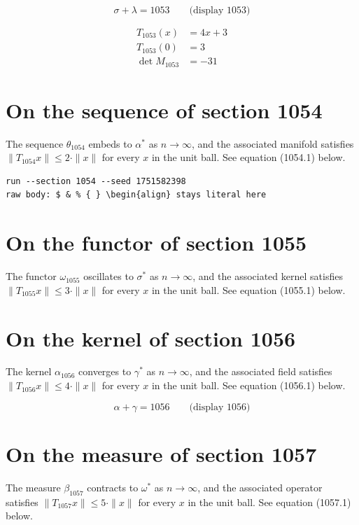 \documentclass{article}
\begin{document}
$$
\sigma + \lambda = 1053 \qquad \text{(display 1053)}
$$

\begin{align}
T_{1053}(x) &= 4 x + 3 \\
T_{1053}(0) &= 3 \\
\det M_{1053} &= -31
\end{align}

\section{On the sequence of section 1054}
The sequence $\theta_{1054}$ embeds to $\alpha^{*}$ as $n \to \infty$,
and the associated manifold satisfies $\|T_{1054} x\| \leq 2 \cdot \|x\|$
for every $x$ in the unit ball. See equation (1054.1) below.

\begin{verbatim}
run --section 1054 --seed 1751582398
raw body: $ & % { } \begin{align} stays literal here
\end{verbatim}

\section{On the functor of section 1055}
The functor $\omega_{1055}$ oscillates to $\sigma^{*}$ as $n \to \infty$,
and the associated kernel satisfies $\|T_{1055} x\| \leq 3 \cdot \|x\|$
for every $x$ in the unit ball. See equation (1055.1) below.

\section{On the kernel of section 1056}
The kernel $\alpha_{1056}$ converges to $\gamma^{*}$ as $n \to \infty$,
and the associated field satisfies $\|T_{1056} x\| \leq 4 \cdot \|x\|$
for every $x$ in the unit ball. See equation (1056.1) below.

$$
\alpha + \gamma = 1056 \qquad \text{(display 1056)}
$$

\section{On the measure of section 1057}
The measure $\beta_{1057}$ contracts to $\omega^{*}$ as $n \to \infty$,
and the associated operator satisfies $\|T_{1057} x\| \leq 5 \cdot \|x\|$
for every $x$ in the unit ball. See equation (1057.1) below.
\end{document}

